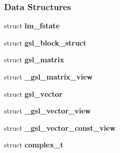 \subsubsection*{Data Structures}
\begin{CompactItemize}
\item 
struct {\bf lm\_\-fstate}
\item 
struct \textbf{gsl\_\-block\_\-struct}
\item 
struct \textbf{gsl\_\-matrix}
\item 
struct \textbf{\_\-gsl\_\-matrix\_\-view}
\item 
struct \textbf{gsl\_\-vector}
\item 
struct \textbf{\_\-gsl\_\-vector\_\-view}
\item 
struct \textbf{\_\-gsl\_\-vector\_\-const\_\-view}
\item 
struct {\bf complex\_\-t}
\end{CompactItemize}
